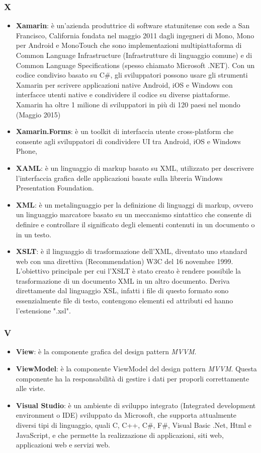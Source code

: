 \subsubsection{X}
\begin{itemize}
	\item \textbf{Xamarin}:  è un'azienda produttrice di software statunitense con sede a San Francisco, California fondata nel maggio 2011 dagli ingegneri di Mono, Mono per Android e MonoTouch che sono implementazioni multipiattaforma di Common Language Infrastructure (Infrastrutture di linguaggio comune) e di Common Language Specifications (spesso chiamato Microsoft .NET). Con un codice condiviso basato su C\#, gli sviluppatori possono usare gli strumenti Xamarin per scrivere applicazioni native Android, iOS e Windows con interfacce utenti native e condividere il codice su diverse piattaforme. Xamarin ha oltre 1 milione di sviluppatori in più di 120 paesi nel mondo (Maggio 2015)
	\item \textbf{Xamarin.Forms}: è un toolkit di interfaccia utente cross-platform che consente agli sviluppatori di condividere UI tra Android, iOS e Windows Phone, 
	\item \textbf{XAML}:  è un linguaggio di markup basato su XML, utilizzato per descrivere l'interfaccia grafica delle applicazioni basate sulla libreria Windows Presentation Foundation.
	\item \textbf{XML}: è un metalinguaggio per la definizione di linguaggi di markup, ovvero un linguaggio marcatore basato su un meccanismo sintattico che consente di definire e controllare il significato degli elementi contenuti in un documento o in un testo.
	\item \textbf{XSLT}: è il linguaggio di trasformazione dell'XML, diventato uno standard web con una direttiva (Recommendation) W3C del 16 novembre 1999. L'obiettivo principale per cui l'XSLT è stato creato è rendere possibile la trasformazione di un documento XML in un altro documento. Deriva direttamente dal linguaggio XSL, infatti i file di questo formato sono essenzialmente file di testo, contengono elementi ed attributi ed hanno l'estensione ".xsl".
\end{itemize}

\subsubsection{V}
\begin{itemize}
	\item \textbf{View}: è la componente grafica del design pattern \textit{MVVM}.
	\item \textbf{ViewModel}: è la componente ViewModel del design pattern \textit{MVVM}. Questa componente ha la responsabilità di gestire i dati per proporli correttamente alle viste.
	\item \textbf{Visual Studio}: è un ambiente di sviluppo integrato (Integrated development environment o IDE) sviluppato da Microsoft, che supporta attualmente diversi tipi di linguaggio, quali C, C++, C\#, F\#, Visual Basic .Net, Html e JavaScript, e che permette la realizzazione di applicazioni, siti web, applicazioni web e servizi web.
\end{itemize}

